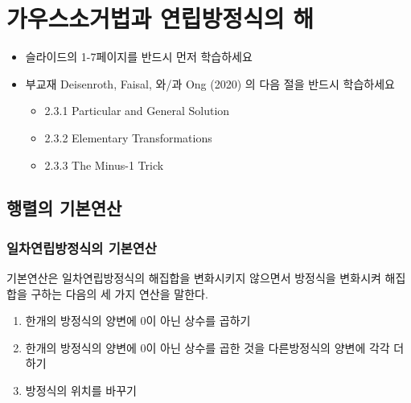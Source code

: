\documentclass[
  11pt,
  a4paper,
  oneside]{scrbook}
\providecommand{\tightlist}{%
  \setlength{\itemsep}{0pt}\setlength{\parskip}{0pt}}\usepackage{longtable,booktabs,array}
\theoremstyle{definition}
\theoremstyle{definition}
\theoremstyle{plain}
\theoremstyle{remark}
\begin{document}

\chapter{가우스소거법과 연립방정식의 해}\label{matrix_equation}

\begin{tcolorbox}[enhanced jigsaw, colback=white, colframe=quarto-callout-important-color-frame, opacityback=0, toprule=.15mm, leftrule=.75mm, titlerule=0mm, opacitybacktitle=0.6, title=\textcolor{quarto-callout-important-color}{\faExclamation}\hspace{0.5em}{중요}, colbacktitle=quarto-callout-important-color!10!white, breakable, bottomrule=.15mm, bottomtitle=1mm, toptitle=1mm, arc=.35mm, left=2mm, rightrule=.15mm, coltitle=black]

\begin{itemize}
\tightlist
\item
  슬라이드의 1-7페이지를 반드시 먼저 학습하세요
\item
  부교재 Deisenroth, Faisal, 와/과 Ong (2020) 의 다음 절을 반드시
  학습하세요

  \begin{itemize}
  \tightlist
  \item
    2.3.1 Particular and General Solution
  \item
    2.3.2 Elementary Transformations
  \item
    2.3.3 The Minus-1 Trick
  \end{itemize}
\end{itemize}

\end{tcolorbox}

\section{행렬의
기본연산}\label{uxd589uxb82cuxc758-uxae30uxbcf8uxc5f0uxc0b0}

\subsection{일차연립방정식의
기본연산}\label{uxc77cuxcc28uxc5f0uxb9bduxbc29uxc815uxc2dduxc758-uxae30uxbcf8uxc5f0uxc0b0}

기본연산은 일차연립방정식의 해집합을 변화시키지 않으면서 방정식을
변화시켜 해집합을 구하는 다음의 세 가지 연산을 말한다.

\begin{enumerate}
\def\labelenumi{\arabic{enumi}.}
\tightlist
\item
  한개의 방정식의 양변에 0이 아닌 상수를 곱하기
\item
  한개의 방정식의 양변에 0이 아닌 상수를 곱한 것을 다른방정식의 양변에
  각각 더하기\\
\item
  방정식의 위치를 바꾸기
\end{enumerate}
\end{document}
